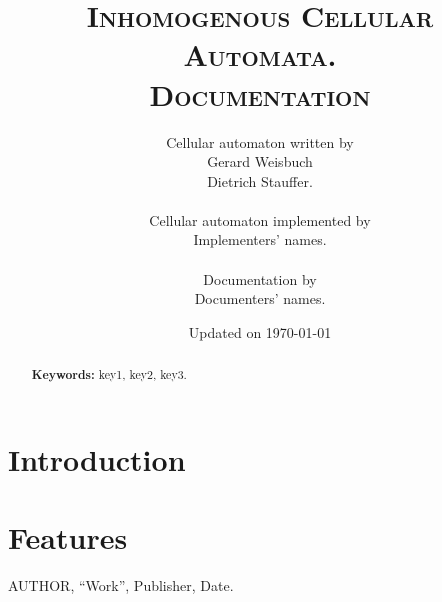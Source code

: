 \documentclass[12pt,a4paper,final]{article}
\title{
	\textsc{Inhomogenous Cellular Automata.}\\
	\textsc{Documentation}}
\author{
	Cellular automaton written by\\
	Gerard Weisbuch\\
	Dietrich Stauffer.\\
	\\
	Cellular automaton implemented by\\
	Implementers' names.\\
	\\
	Documentation by\\
	Documenters' names.}
\date{Updated on \today}
\begin{document}
	\maketitle
	\begin{abstract}
		\lipsum[1]
		\vspace{2mm}
		\textbf{Keywords: } key1, key2, key3.
	\end{abstract}

\section{Introduction}
	\lipsum[2]

\section{Features}
	\lipsum[3]

\begin{thebibliography}{99}
 AUTHOR, ``Work'', Publisher, Date.
\end{thebibliography}
\end{document}
